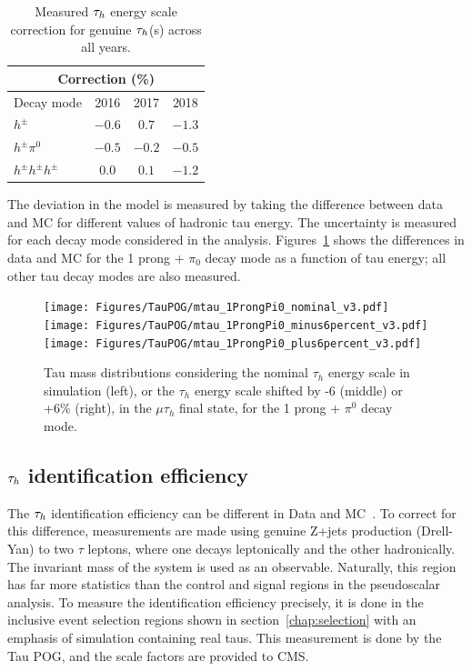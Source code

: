 \begin{table}[h]
  \begin{center}
    \label{tab:TES}
    \begin{tabular} { l | c  c  c }
      \hline \multicolumn{4}{c}{Correction (\%)} \\
      \hline Decay mode & 2016 & 2017 & 2018 \\ \hline
      $h^{\pm}$ & $-0.6$ & $0.7$ & $-1.3$  \\ 
      $h^{\pm}\pi^{0}$ & $-0.5$ & $-0.2$ & $-0.5$  \\ 
      $h^{\pm}h^{\pm}h^{\pm}$ & $0.0$ & $0.1$ & $-1.2$ \\ 
    \end{tabular}
    \caption{Measured $\tau_h$ energy scale correction for genuine $\tau_h$(s) across all years.}
  \end{center}
\end{table}

The deviation in the model is measured by taking the difference between data and MC for different values of hadronic tau energy. The uncertainty is measured for each decay mode considered in the analysis. Figures~\ref{fig:taues} shows the differences in data and MC for the 1 prong + $\pi_0$ decay mode as a function of tau energy; all other tau decay modes are also measured. 

\begin{figure}[h!]
    \begin{center}
        \texttt{[image: Figures/TauPOG/mtau\_1ProngPi0\_nominal\_v3.pdf]}
        \texttt{[image: Figures/TauPOG/mtau\_1ProngPi0\_minus6percent\_v3.pdf]}
        \texttt{[image: Figures/TauPOG/mtau\_1ProngPi0\_plus6percent\_v3.pdf]}
    \end{center}
    \caption{Tau mass distributions considering the nominal $\tau_h$ energy scale in simulation (left), or the $\tau_h$ energy scale shifted by -6 (middle) or +6\% (right), in the $\mu\tau_h$ final state, for the 1 prong + $\pi^0$ decay mode.}
    \label{fig:taues}
\end{figure}

\subsection{$\tau_h$ identification efficiency}

The $\tau_h$ identification efficiency can be different in Data and MC~\cite{TAUIDTwiki}. To correct for this difference, measurements are 
made using genuine Z+jets production (Drell-Yan) to two $\tau$ leptons, where one decays leptonically and the other hadronically. The invariant mass of the system is used as an observable. Naturally, this region has far more statistics than the control and signal regions in the pseudoscalar analysis. To measure the identification efficiency precisely, it is done in the inclusive event selection regions shown in section~\ref{chap:selection} with an emphasis of simulation containing real taus. This measurement is done by the Tau POG, and the scale factors are provided to CMS. 

